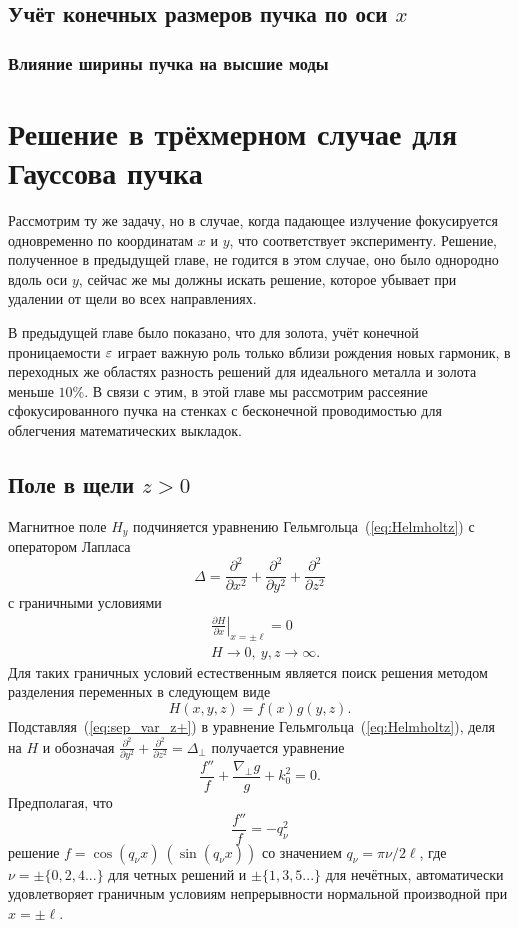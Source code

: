 \section{Учёт конечных размеров пучка по оси $x$}
\subsection{Влияние ширины пучка на высшие моды}

\chapter{Решение в трёхмерном случае для Гауссова пучка}
Рассмотрим ту же задачу, но в случае, когда падающее излучение фокусируется одновременно по координатам $x$ и $y$, что соответствует эксперименту. Решение, полученное в предыдущей главе, не годится в этом случае, оно было однородно вдоль оси $y$, сейчас же мы должны искать решение, которое убывает при удалении от щели во всех направлениях. 

В предыдущей главе было показано, что для золота, учёт конечной проницаемости $\varepsilon$ играет важную роль только вблизи рождения новых гармоник, в переходных же областях разность решений для идеального металла и золота меньше $10\%$. В связи с этим, в этой главе мы рассмотрим рассеяние сфокусированного пучка на стенках с бесконечной проводимостью для облегчения математических выкладок.

\section{Поле в щели $z > 0$}
Магнитное поле $H_y$ подчиняется уравнению Гельмгольца~(\ref{eq:Helmholtz}) с оператором Лапласа 
$$
\Delta = \frac{\partial^2}{\partial x^2} + \frac{\partial^2}{\partial y^2} + \frac{\partial^2}{\partial z^2}
$$
с граничными условиями 
\begin{align}
    &\left.\frac{\partial H}{\partial x}\right|_{x = \pm \ell} = 0\\
    &H \to 0, \ y,z\to \infty.
\end{align}
Для таких граничных условий естественным является поиск решения методом разделения переменных в следующем виде
\begin{equation}
H(x,y,z) = f(x) g(y,z).
\label{eq:sep_var_z+}
\end{equation}
Подставляя~(\ref{eq:sep_var_z+}) в уравнение Гельмгольца~(\ref{eq:Helmholtz}), деля на $H$ и обозначая $ \frac{\partial^2}{\partial y^2} + \frac{\partial^2}{\partial z^2} = \Delta_\perp$ получается уравнение
\begin{equation}
    \frac{f''}{f} + \frac{\nabla_\perp g}{g} + k_0^2 = 0.
    \label{eq:sep_var_z+_2}
\end{equation}
Предполагая, что 
$$
\frac{f''}{f} = -q^2_\nu
$$
решение $f = \cos{(q_\nu x)} \ (\sin(q_\nu x))$ со значением $q_\nu = \pi \nu /2\ell$, где $\nu = \pm \{0,2,4...\}$ для четных
решений и $\pm \{1,3,5...\}$ для нечётных, автоматически удовлетворяет 
граничным условиям непрерывности нормальной производной при $x = \pm \ell$. 

